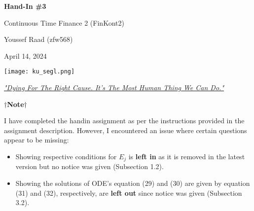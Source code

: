 \documentclass[11pt]{article}
\numberwithin{equation}{section}
\begin{document}
\begin{titlepage}
    \begin{center}
        \vspace*{1cm}
        
        
        \Huge
        \textbf{Hand-In \#3}
        
        \vspace{0.5cm}
        \LARGE
        Continuous Time Finance 2 (FinKont2)
        
        \vspace{0.5cm}
        
        Youssef Raad (zfw568)
    
        
        \vspace{0.5cm}
         April  14, 2024
        
    \end{center}
    \vspace{2.5cm}
    \begin{center}
        \texttt{[image: ku\_segl.png]}
    \end{center}
    \vspace{5.5cm}
    \begin{center}
        \textit{\href{https://www.youtube.com/watch?v=jXD98S28qT8}{"Dying For The Right Cause. It's The Most Human Thing We Can Do."}}
    \end{center}
\end{titlepage}
\captionsetup[figure]{labelfont=bf} \captionsetup[table]{labelfont=bf}
\fancyhead[R]{ }
\setlength{\headheight}{40pt}
\newpage
\tableofcontents
\cfoot{\thepage\ / \pageref{LastPage}}

\begin{center}
    $\dagger$\textbf{Note}$\dagger$
\end{center}
\begin{center}
I have completed the handin assignment as per the instructions provided in the
assignment description. However, I encountered an issue where certain questions
appear to be missing:
\begin{itemize}
    \item Showing respective conditions for $E_j$ is \textbf{left in} as it is removed in the
    latest version but no notice was given (Subsection 1.2).
    \item Showing the solutions of ODE's equation (29) and (30) are given by equation (31)
    and (32), respectively, are \textbf{left out} since notice was given (Subsection 3.2).
\end{itemize}

\end{center}
\end{document}
